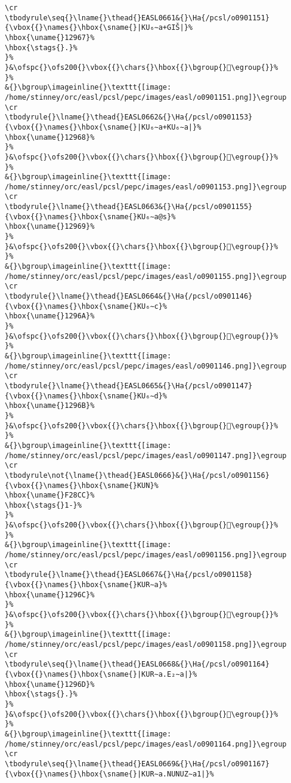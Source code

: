 \begin{verbatim}
\cr
\tbodyrule\seq{}\lname{}\thead{}EASL0661&{}\Ha{/pcsl/o0901151}{\vbox{{}\names{}\hbox{\sname{}|KU₆∼a+GIŠ|}%
\hbox{\uname{}12967}%
\hbox{\stags{}.}%
}%
}&\ofspc{}\ofs200{}\vbox{{}\chars{}\hbox{{}\bgroup{}𒥧\egroup{}}%
}%
&{}\bgroup\imageinline{}\texttt{[image: /home/stinney/orc/easl/pcsl/pepc/images/easl/o0901151.png]}\egroup
\cr
\tbodyrule{}\lname{}\thead{}EASL0662&{}\Ha{/pcsl/o0901153}{\vbox{{}\names{}\hbox{\sname{}|KU₆∼a+KU₆∼a|}%
\hbox{\uname{}12968}%
}%
}&\ofspc{}\ofs200{}\vbox{{}\chars{}\hbox{{}\bgroup{}𒥨\egroup{}}%
}%
&{}\bgroup\imageinline{}\texttt{[image: /home/stinney/orc/easl/pcsl/pepc/images/easl/o0901153.png]}\egroup
\cr
\tbodyrule{}\lname{}\thead{}EASL0663&{}\Ha{/pcsl/o0901155}{\vbox{{}\names{}\hbox{\sname{}KU₆∼a@s}%
\hbox{\uname{}12969}%
}%
}&\ofspc{}\ofs200{}\vbox{{}\chars{}\hbox{{}\bgroup{}𒥩\egroup{}}%
}%
&{}\bgroup\imageinline{}\texttt{[image: /home/stinney/orc/easl/pcsl/pepc/images/easl/o0901155.png]}\egroup
\cr
\tbodyrule{}\lname{}\thead{}EASL0664&{}\Ha{/pcsl/o0901146}{\vbox{{}\names{}\hbox{\sname{}KU₆∼c}%
\hbox{\uname{}1296A}%
}%
}&\ofspc{}\ofs200{}\vbox{{}\chars{}\hbox{{}\bgroup{}𒥪\egroup{}}%
}%
&{}\bgroup\imageinline{}\texttt{[image: /home/stinney/orc/easl/pcsl/pepc/images/easl/o0901146.png]}\egroup
\cr
\tbodyrule{}\lname{}\thead{}EASL0665&{}\Ha{/pcsl/o0901147}{\vbox{{}\names{}\hbox{\sname{}KU₆∼d}%
\hbox{\uname{}1296B}%
}%
}&\ofspc{}\ofs200{}\vbox{{}\chars{}\hbox{{}\bgroup{}𒥫\egroup{}}%
}%
&{}\bgroup\imageinline{}\texttt{[image: /home/stinney/orc/easl/pcsl/pepc/images/easl/o0901147.png]}\egroup
\cr
\tbodyrule\not{\lname{}\thead{}EASL0666}&{}\Ha{/pcsl/o0901156}{\vbox{{}\names{}\hbox{\sname{}KUN}%
\hbox{\uname{}F28CC}%
\hbox{\stags{}1-}%
}%
}&\ofspc{}\ofs200{}\vbox{{}\chars{}\hbox{{}\bgroup{}󲣌\egroup{}}%
}%
&{}\bgroup\imageinline{}\texttt{[image: /home/stinney/orc/easl/pcsl/pepc/images/easl/o0901156.png]}\egroup
\cr
\tbodyrule{}\lname{}\thead{}EASL0667&{}\Ha{/pcsl/o0901158}{\vbox{{}\names{}\hbox{\sname{}KUR∼a}%
\hbox{\uname{}1296C}%
}%
}&\ofspc{}\ofs200{}\vbox{{}\chars{}\hbox{{}\bgroup{}𒥬\egroup{}}%
}%
&{}\bgroup\imageinline{}\texttt{[image: /home/stinney/orc/easl/pcsl/pepc/images/easl/o0901158.png]}\egroup
\cr
\tbodyrule\seq{}\lname{}\thead{}EASL0668&{}\Ha{/pcsl/o0901164}{\vbox{{}\names{}\hbox{\sname{}|KUR∼a.E₂∼a|}%
\hbox{\uname{}1296D}%
\hbox{\stags{}.}%
}%
}&\ofspc{}\ofs200{}\vbox{{}\chars{}\hbox{{}\bgroup{}𒥭\egroup{}}%
}%
&{}\bgroup\imageinline{}\texttt{[image: /home/stinney/orc/easl/pcsl/pepc/images/easl/o0901164.png]}\egroup
\cr
\tbodyrule\seq{}\lname{}\thead{}EASL0669&{}\Ha{/pcsl/o0901167}{\vbox{{}\names{}\hbox{\sname{}|KUR∼a.NUNUZ∼a1|}%

\end{verbatim}

